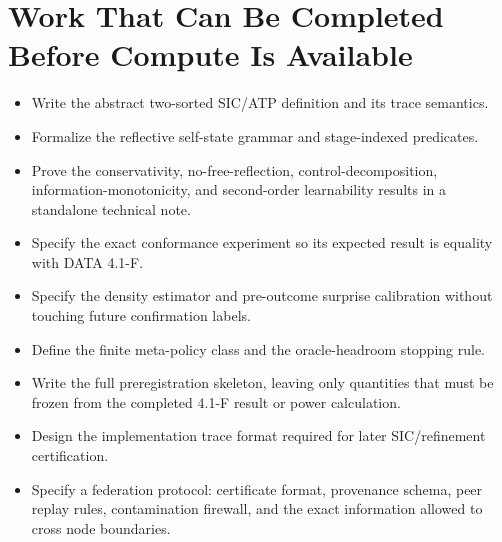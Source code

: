 \documentclass[11pt]{article}
\begin{document}
\section{Work That Can Be Completed Before Compute Is Available}
\begin{itemize}
\item Write the abstract two-sorted SIC/ATP definition and its trace semantics.
\item Formalize the reflective self-state grammar and stage-indexed predicates.
\item Prove the conservativity, no-free-reflection, control-decomposition, information-monotonicity, and second-order learnability results in a standalone technical note.
\item Specify the exact conformance experiment so its expected result is equality with DATA 4.1-F.
\item Specify the density estimator and pre-outcome surprise calibration without touching future confirmation labels.
\item Define the finite meta-policy class and the oracle-headroom stopping rule.
\item Write the full preregistration skeleton, leaving only quantities that must be frozen from the completed 4.1-F result or power calculation.
\item Design the implementation trace format required for later SIC/refinement certification.
\item Specify a federation protocol: certificate format, provenance schema, peer replay rules, contamination firewall, and the exact information allowed to cross node boundaries.
\end{itemize}
\end{document}
